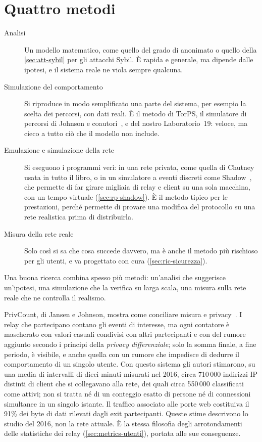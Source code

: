 \section{Quattro metodi}\label{sec:ric-metodi}

\begin{description}
  \item[Analisi] Un modello matematico, come quello del grado di anonimato o quello della \cref{sec:att-sybil} per gli attacchi Sybil. È rapida e generale, ma dipende dalle ipotesi, e il sistema reale ne viola sempre qualcuna.
  \item[Simulazione del comportamento] Si riproduce in modo semplificato una parte del sistema, per esempio la scelta dei percorsi, con dati reali. È il metodo di TorPS, il simulatore di percorsi di Johnson e coautori~\cite{johnson2013users}, e del nostro Laboratorio~19: veloce, ma cieco a tutto ciò che il modello non include.
  \item[Emulazione e simulazione della rete] Si eseguono i programmi veri: in una rete privata, come quella di Chutney usata in tutto il libro, o in un simulatore a eventi discreti come Shadow~\cite{jansen2012shadow}, che permette di far girare migliaia di relay e client su una sola macchina, con un tempo virtuale (\cref{sec:rp-shadow}). È il metodo tipico per le prestazioni, perché permette di provare una modifica del protocollo su una rete realistica prima di distribuirla.
  \item[Misura della rete reale] Solo così si sa che cosa succede davvero, ma è anche il metodo più rischioso per gli utenti, e va progettato con cura (\cref{sec:ric-sicurezza}).
\end{description}
Una buona ricerca combina spesso più metodi: un'analisi che suggerisce un'ipotesi, una simulazione che la verifica su larga scala, una misura sulla rete reale che ne controlla il realismo.

\begin{approfondimento}
PrivCount, di Jansen e Johnson, mostra come conciliare misura e privacy~\cite{jansen2016privcount}. I relay che partecipano contano gli eventi di interesse, ma ogni contatore è mascherato con valori casuali condivisi con altri partecipanti e con del rumore aggiunto secondo i principi della \emph{privacy differenziale}; solo la somma finale, a fine periodo, è visibile, e anche quella con un rumore che impedisce di dedurre il comportamento di un singolo utente. Con questo sistema gli autori stimarono, su una media di intervalli di dieci minuti misurati nel 2016, circa 710\,000 indirizzi IP distinti di client che si collegavano alla rete, dei quali circa 550\,000 classificati come attivi; non si tratta né di un conteggio esatto di persone né di connessioni simultanee in un singolo istante. Il traffico associato alle porte web costituiva il 91\% dei byte di dati rilevati dagli exit partecipanti. Queste stime descrivono lo studio del 2016, non la rete attuale. È la stessa filosofia degli arrotondamenti delle statistiche dei relay (\cref{sec:metrics-utenti}), portata alle sue conseguenze.
\end{approfondimento}

